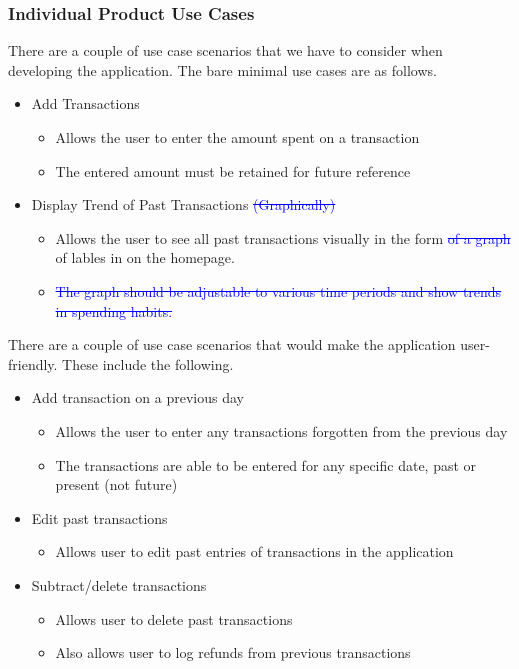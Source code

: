 \documentclass[12pt, titlepage]{article}
\begin{document}
\subsubsection{Individual Product Use Cases}
There are a couple of use case scenarios that we have to consider when developing the application. The bare minimal use cases are as follows.
\begin{itemize}
   \item Add Transactions
   \begin{itemize}
     \item Allows the user to enter the amount spent on a transaction
     \item The entered amount must be retained for future reference
   \end{itemize}
   \item Display Trend of Past Transactions\textcolor{blue}{ \st{ (Graphically)}}
   \begin{itemize}
     \item Allows the user to see all past transactions visually in the form \textcolor{blue}{\st{of a graph}} of lables in on the homepage.
     \item \textcolor{blue}{\st{The graph should be adjustable to various time periods and show trends in spending habits.}}
   \end{itemize}
\end{itemize}

There are a couple of use case scenarios that would make the application user-friendly. These include the following.
\begin{itemize}
   \item Add transaction on a previous day
   \begin{itemize}
     \item Allows the user to enter any transactions forgotten from the previous day
     \item The transactions are able to be entered for any specific date, past or present (not future)
   \end{itemize}
   \item Edit past transactions
   \begin{itemize}
     \item Allows user to edit past entries of transactions in the application
   \end{itemize}
   \item Subtract/delete transactions
   \begin{itemize}
     \item Allows user to delete past transactions
    \item Also allows user to log refunds from previous transactions
   \end{itemize}
\end{itemize}
\end{document}
